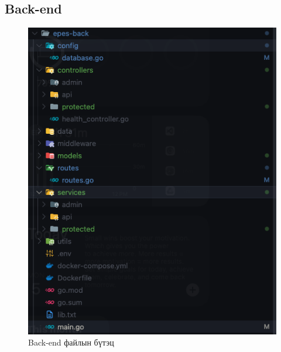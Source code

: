 \subsection{Back-end}

\begin{figure}[H]
    \centering
    \includegraphics[scale=0.5]{src/images/uiux/backFileStruc.png}
    \caption{Back-end файлын бүтэц}
    \label{fig:back_file_struct}
\end{figure}